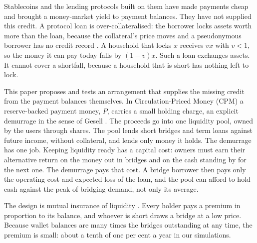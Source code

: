 \documentclass[10pt,a4paper]{article}
\theoremstyle{remark}
\begin{document}
Stablecoins and the lending protocols built on them have made payments cheap
and brought a money-market yield to payment balances. They have not
supplied this credit. A protocol loan is over-collateralised: the borrower
locks assets worth more than the loan, because the collateral's price moves
and a pseudonymous borrower has no credit record
\cite{aramonte,gudgeon,carapella,schar}. A household that
locks \(x\) receives \(vx\) with \(v<1\), so the money it can pay today falls
by \((1-v)x\). Such a loan exchanges assets. It cannot cover a
shortfall, because a household that is short has nothing left to lock.

This paper proposes and tests an arrangement that supplies the missing credit
from the payment balances themselves. In Circulation-Priced Money (CPM) a
reserve-backed payment money, \(P\), carries a small holding charge, an
explicit demurrage in the sense of Gesell \cite{gesell,buiter}. The proceeds
go into one liquidity pool, owned by the users through shares. The pool
lends short bridges and term loans against future income, without collateral,
and lends only money it holds. The demurrage has one job. Keeping liquidity ready
has a capital cost: owners must earn their alternative return on the money
out in bridges and on the cash standing by for the next one. The
demurrage pays that cost. A bridge borrower then pays only the operating cost and
expected loss of the loan, and the pool can afford to hold cash against
the peak of bridging demand, not only its average.

The design is mutual insurance of liquidity
\cite{diamonddybvig,holmstrom}. Every holder pays a premium in proportion to
its balance, and whoever is short draws a bridge at a low price. Because
wallet balances are many times the bridges outstanding at any
time, the premium is small: about a tenth of one per cent a year in our
simulations.
\end{document}

